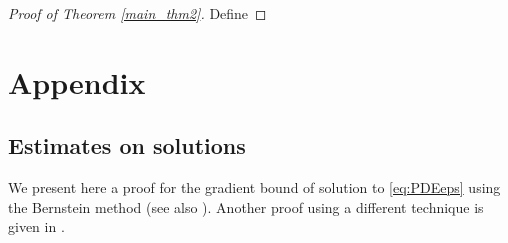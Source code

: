\documentclass[12pt,reqno]{amsart}
\numberwithin{figure}{section}
\theoremstyle{plain}
\theoremstyle{remark}
\numberwithin{equation}{section}
\begin{document}
\begin{proof}[Proof of Theorem \ref{main_thm2}] Define 

\end{proof}





\section*{Appendix}
\subsection*{Estimates on solutions}
We present here a proof for the gradient bound of solution to \eqref{eq:PDEeps} using the Bernstein method (see also \cite{Lasry1989,lions_quelques_1985}). Another proof using a different technique is given in \cite{Armstrong2015a}.
\end{document}
